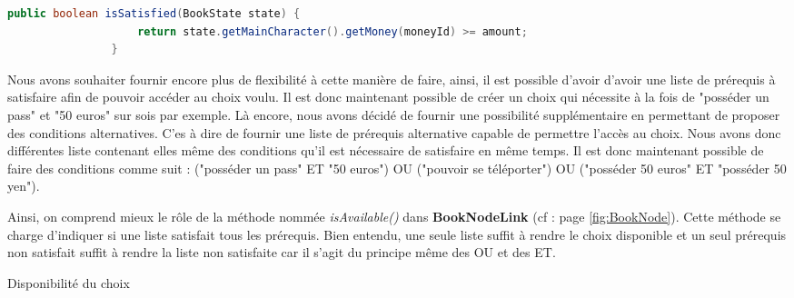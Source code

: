 			\begin{lstlisting}[gobble=16, language=java, caption=RequirementMoney.isSatisfied(), label=lst:isSatisfied]
				public boolean isSatisfied(BookState state) {
					return state.getMainCharacter().getMoney(moneyId) >= amount;
				}
			\end{lstlisting}

			Nous avons souhaiter fournir encore plus de flexibilité à cette manière de faire, ainsi, il est possible d'avoir d'avoir une liste de prérequis à satisfaire afin de pouvoir accéder au choix voulu. Il est donc maintenant possible de créer un choix qui nécessite à la fois de "posséder un pass" et "50 euros" sur sois par exemple. Là encore, nous avons décidé de fournir une possibilité supplémentaire en permettant de proposer des conditions alternatives. C'es à dire de fournir une liste de prérequis alternative capable de permettre l'accès au choix. Nous avons donc différentes liste contenant elles même des conditions qu'il est nécessaire de satisfaire en même temps. Il est donc maintenant possible de faire des conditions comme suit : ("posséder un pass" ET "50 euros") OU ("pouvoir se téléporter") OU ("posséder 50 euros" ET "posséder 50 yen").

			Ainsi, on comprend mieux le rôle de la méthode nommée \textit{isAvailable()} dans \textbf{BookNodeLink} (cf :  page \ref{fig:BookNode}). Cette méthode se charge d'indiquer si une liste satisfait tous les prérequis. Bien entendu, une seule liste suffit à rendre le choix disponible et un seul prérequis non satisfait suffit à rendre la liste non satisfaite car il s'agit du principe même des OU et des ET.


			\begin{algorithm}[H]
				\DontPrintSemicolon

				\;
				\;

				\caption{Disponibilité du choix}
			\end{algorithm}

